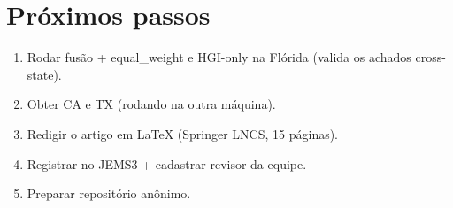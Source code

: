 \documentclass[12pt,a4paper]{article}
\begin{document}
\section{Próximos passos}

\begin{enumerate}[noitemsep]
\item Rodar fusão + equal\_weight e HGI-only na Flórida (valida os achados cross-state).
\item Obter CA e TX (rodando na outra máquina).
\item Redigir o artigo em LaTeX (Springer LNCS, 15 páginas).
\item Registrar no JEMS3 + cadastrar revisor da equipe.
\item Preparar repositório anônimo.
\end{enumerate}
\end{document}
